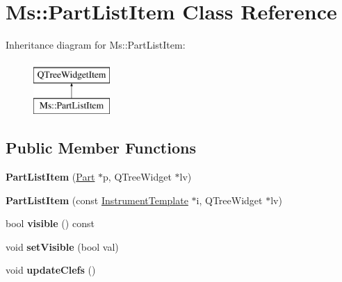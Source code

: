 \hypertarget{class_ms_1_1_part_list_item}{}\section{Ms\+:\+:Part\+List\+Item Class Reference}
\label{class_ms_1_1_part_list_item}
Inheritance diagram for Ms\+:\+:Part\+List\+Item\+:\begin{figure}[H]
\begin{center}
\leavevmode
\includegraphics[height=2.000000cm]{class_ms_1_1_part_list_item}
\end{center}
\end{figure}
\subsection*{Public Member Functions}
\begin{DoxyCompactItemize}
\item 
\mbox{\label{class_ms_1_1_part_list_item_a755b35bf0cd5762aad9df5fdcb714919}} 
{\bfseries Part\+List\+Item} (\hyperlink{class_ms_1_1_part}{Part} $\ast$p, Q\+Tree\+Widget $\ast$lv)
\item 
\mbox{\label{class_ms_1_1_part_list_item_a2396900f5de3d78279fcb0a813d77e0d}} 
{\bfseries Part\+List\+Item} (const \hyperlink{class_ms_1_1_instrument_template}{Instrument\+Template} $\ast$i, Q\+Tree\+Widget $\ast$lv)
\item 
\mbox{\label{class_ms_1_1_part_list_item_a9eee4b3790dd8e91eef15291ab1f56c2}} 
bool {\bfseries visible} () const
\item 
\mbox{\label{class_ms_1_1_part_list_item_a22edd4ef961336ff8a4fb831085ffed2}} 
void {\bfseries set\+Visible} (bool val)
\item 
\mbox{\label{class_ms_1_1_part_list_item_a567f34d71926a637a384b4c39bf6538c}} 
void {\bfseries update\+Clefs} ()
\end{DoxyCompactItemize}
